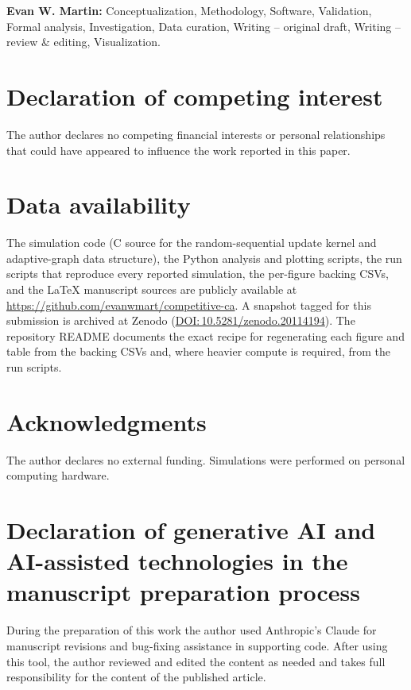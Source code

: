 \documentclass[preprint,12pt]{elsarticle}
\begin{document}
\textbf{Evan W. Martin:}
Conceptualization, Methodology, Software, Validation,
Formal analysis, Investigation, Data curation,
Writing -- original draft, Writing -- review \& editing,
Visualization.

\section*{Declaration of competing interest}

The author declares no competing financial interests
or personal relationships that could have appeared to
influence the work reported in this paper.

\section*{Data availability}

The simulation code (C source for the random-sequential
update kernel and adaptive-graph data structure), the Python
analysis and plotting scripts, the run scripts that reproduce
every reported simulation, the per-figure backing CSVs, and
the LaTeX manuscript sources are publicly available at
\url{https://github.com/evanwmart/competitive-ca}.
A snapshot tagged for this submission is archived at Zenodo
(\href{https://doi.org/10.5281/zenodo.20114194}%
{DOI:\,10.5281/zenodo.20114194}).
The repository README documents the exact recipe for
regenerating each figure and table from the backing CSVs and,
where heavier compute is required, from the run scripts.

\section*{Acknowledgments}
The author declares no external funding.
Simulations were performed on personal computing hardware.

\section*{Declaration of generative AI and AI-assisted technologies in the manuscript preparation process}
During the preparation of this work the author used Anthropic's Claude
for manuscript revisions and bug-fixing assistance in supporting code.
After using this tool, the author reviewed and edited the content as
needed and takes full responsibility for the content of the published
article.



\end{document}
